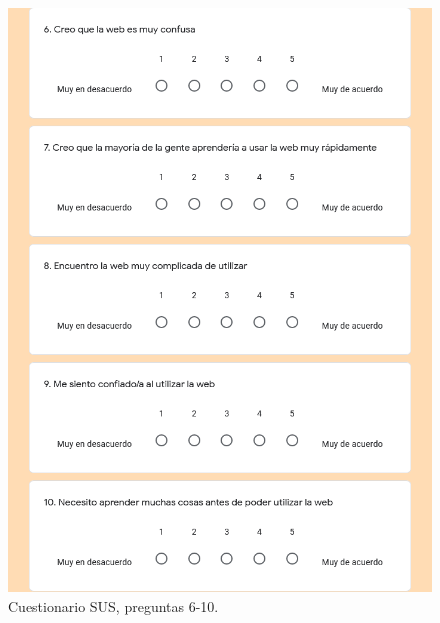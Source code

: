 \begin{figure}[h!]
	\centering
	\includegraphics[width=0.7\linewidth]{Imagenes/Bitmap/Valoracion_general_sus2}
	\caption{Cuestionario SUS, preguntas 6-10.}
	\label{fig:valoraciongeneralsus2}
\end{figure}




